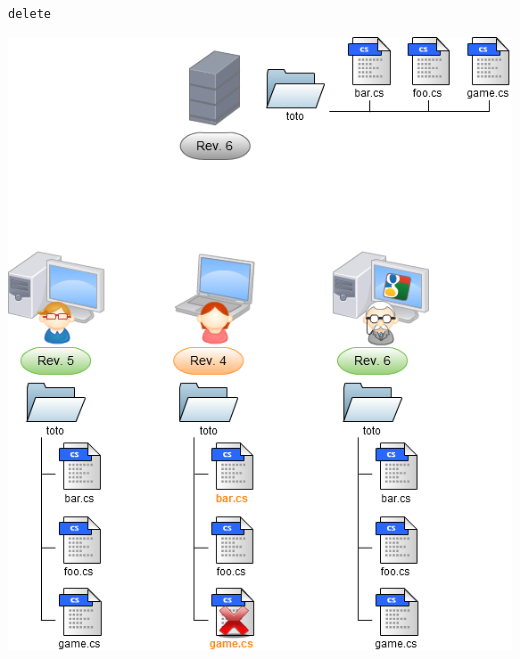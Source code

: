 \begin{frame}
  \texttt{delete}
  \begin{center}
    \vspace{-12pt}
    \includegraphics[scale=0.3]{images/7-Work.png}
  \end{center}
\end{frame}


